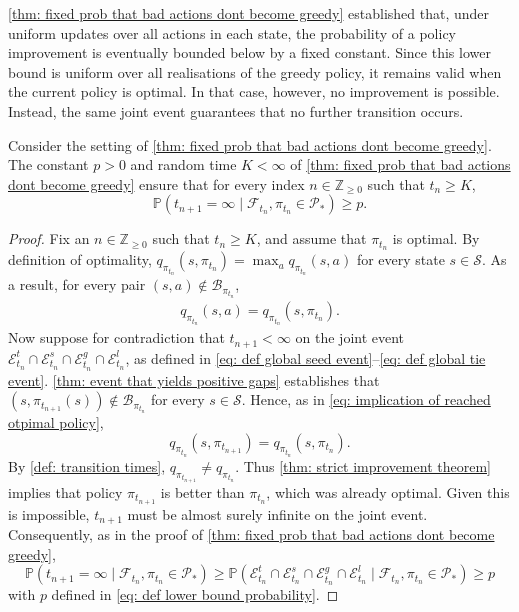 \autoref{thm: fixed prob that bad actions dont become greedy} established that, under uniform updates over all actions in each state, the probability of a policy improvement is eventually bounded below by a fixed constant. Since this lower bound is uniform over all realisations of the greedy policy, it remains valid when the current policy is optimal. In that case, however, no improvement is possible. Instead, the same joint event guarantees that no further transition occurs.

\vspace{0.3cm}

\begin{proposition}
\label{thm: prob policy remains optimal}
Consider the setting of \autoref{thm: fixed prob that bad actions dont become greedy}.
The constant $p>0$ and random time $K<\infty$ of \autoref{thm: fixed prob that bad actions dont become greedy} ensure that
for every index $n \in \mathbb Z_{\ge 0}$ such that $t_n \ge K$,
\[
\mathbb P (t_{n+1} = \infty \mid \mathcal F_{t_n}, \pi_{t_n} \in \mathcal P_* ) \ge p .
\]
\end{proposition}
\vspace{-0.6cm}
\begin{proof}
Fix an $n \in \mathbb Z_{\ge 0}$ such that $t_n \ge K$,
and assume that $\pi_{t_n}$ is optimal.
By definition of optimality, 
$q_{\pi_{t_n}}(s, \pi_{t_n} ) = \max_a q_{\pi_{t_n}}(s,a)$
for every state $s \in \mathcal S$.
As a result, for every pair
$(s,a) \notin \mathcal B_{\pi_{t_n}}$,
\begin{align}
\label{eq: implication of reached otpimal policy}
q_{\pi_{t_n}}(s,a) = q_{\pi_{t_n}}(s, \pi_{t_n}) .
\end{align}
Now suppose for contradiction that $t_{n+1} < \infty$
on the joint event $\mathcal E^t_{t_n} \cap \mathcal E^s_{t_n} \cap \mathcal E^g_{t_n} \cap \mathcal E^l_{t_n}$, as defined in \eqref{eq: def global seed event}--\eqref{eq: def global tie event}.
\autoref{thm: event that yields positive gaps} establishes that $(s,\pi_{t_{n+1}}(s)) \notin \mathcal B_{\pi_{t_n}}$ for every $s \in \mathcal S$. Hence, as in \eqref{eq: implication of reached otpimal policy},
\[
q_{\pi_{t_n}}(s,\pi_{t_{n+1}}) = q_{\pi_{t_n}}(s,\pi_{t_n}) .
\]
By \autoref{def: transition times}, $q_{\pi_{t_{n+1}}} \neq q_{\pi_{t_n}}$. Thus \autoref{thm: strict improvement theorem} implies that policy $\pi_{t_{n+1}}$ is better than $\pi_{t_{n}}$, which was already optimal. Given this is impossible, $t_{n+1}$ must be almost surely infinite on the joint event.
Consequently, as in the proof of \autoref{thm: fixed prob that bad actions dont become greedy},
\[
\mathbb P (t_{n+1} = \infty \mid \mathcal F_{t_n}, \pi_{t_n} \in \mathcal P_* )
\ge
\mathbb P(\mathcal E^t_{t_n} \cap \mathcal E^s_{t_n} \cap \mathcal E^g_{t_n} \cap \mathcal E^l_{t_n} \mid \mathcal F_{t_n}, \pi_{t_n} \in \mathcal P_* )
\ge p
\]
with $p$ defined in \eqref{eq: def lower bound probability}.
\end{proof}



